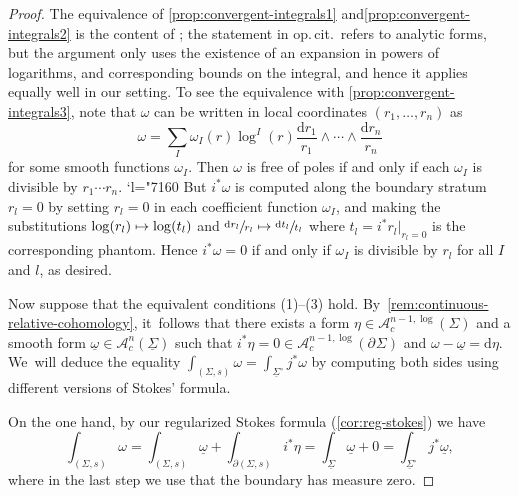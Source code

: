 \documentclass[JEP,XML,SOM,Unicode,NoFloatCountersInSection,published]{cedram}
\newcommand{\Changel}{\mathcode`l="7160}
\let\oldbullet\bullet
\renewcommand{\bullet}{{\raisebox{1pt}{$\scriptscriptstyle\oldbullet$}}}
\newcommand\mto{\mathchoice{\longmapsto}{\mapsto}{\mapsto}{\mapsto}}
\newcommand{\dslog}[1]{\sfrac{\dd#1}{#1}}
\theoremstyle{definition}
\theoremstyle{remark}
\newcommand{\uomega}{\underline{\omega}}
\newcommand{\rbrac}[1]{\left(#1\right)}
\newcommand{\dd}{\mathrm{d}}
\newcommand{\dlog}[1]{\frac{\dd#1}{#1}}
\newcommand{\Ac}[2][\bullet]{\mathscr{A}_c^{#1}\rbrac{#2}}
\newcommand{\Alogc}[2][\bullet]{\mathscr{A}^{#1,\log}_c(#2)}
\newcommand{\Sig}{\Sigma}
\newcommand{\uSig}{\underline{\Sigma}}
\newcommand{\uSigo}{\underline{\Sigma}^\circ}
\newcommand{\bdSig}[1][]{\partial^{#1}\Sigma}
\begin{document}
\begin{proof}
The equivalence of \eqref{prop:convergent-integrals1} and\eqref{prop:convergent-integrals2} is the content of \cite[Lem.\,4.9]{Brown2009}; the statement in {op.\,cit.}~refers to analytic forms, but the argument only uses the existence of an expansion in powers of logarithms, and corresponding bounds on the integral, and hence it applies equally well in our setting. To see the equivalence with \eqref{prop:convergent-integrals3}, note that $\omega$ can be written in local coordinates $(r_1,\ldots,r_n)$ as
\[
\omega = \sum_I \omega_I(r)\log^I(r) \dlog{r_1} \wedge \cdots\wedge \dlog{r_n}
\]
for some smooth functions $\omega_I$. Then $\omega$ is free of poles if and only if each $\omega_I$ is divisible by $r_1\cdots r_n$.
\Changel{}%
But $i^*\omega$ is computed along the boundary stratum $r_l = 0$ by setting $r_l=0$ in each coefficient function $\omega_I$, and making the substitutions $\log(r_l) \mto \log(t_l)$ and $\dslog{r_l}\mto \dslog{t_l}$ where $t_l = i^*r_l|_{r_l=0}$ is the corresponding phantom. Hence $i^*\omega = 0$ if and only if $\omega_I$ is divisible by $r_l$ for all $I$ and $l$, as desired.

Now suppose that the equivalent conditions (1)--(3) hold. By~\autoref{rem:continuous-relative-cohomology}, it~follows that there exists a form $\eta \in \Alogc[n-1]{\Sig}$ and a smooth form $\uomega \in \Ac[n]{\uSig}$ such that $i^*\eta = 0 \in \Alogc[n-1]{\bdSig}$ and $\omega - \underline{\omega} = \dd\eta$. We~will deduce the equality $\int_{(\Sig,s)}\omega = \int_{\uSigo} j^*\omega$ by computing both sides using different versions of Stokes' formula.

On the one hand, by our regularized Stokes formula (\autoref{cor:reg-stokes}) we have\vspace*{-3pt}
\begin{equation}
\int_{(\Sig,s)}\omega = \int_{(\Sig,s)}\underline{\omega} + \int_{\partial(\Sig,s)}i^*\eta = \int_{\uSig}\underline{\omega}+0 = \int_{\uSigo}j^*\underline{\omega},\label{eq:convergent-eq1}
\end{equation}
where in the last step we use that the boundary has measure zero.


\end{proof}
\end{document}

